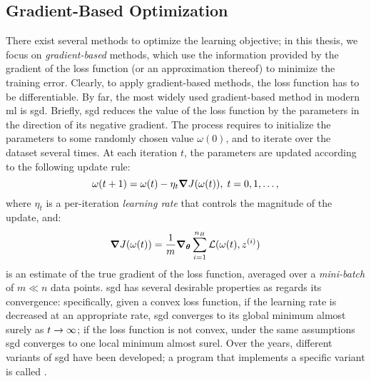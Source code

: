 \subsection{Gradient-Based Optimization}
There exist several methods to optimize the learning objective; in this thesis, we focus on \emph{gradient-based} methods, which use the information provided by the gradient of the loss function (or an approximation thereof) to minimize the training error. Clearly, to apply gradient-based methods, the loss function has to be differentiable. By far, the most widely used gradient-based method in modern \gls{ml} is \gls{sgd}. Briefly, \gls{sgd} reduces the value of the loss function by  the parameters in the direction of its negative gradient. The process requires to initialize the parameters to some randomly chosen value $\omega(0)$, and to iterate over the dataset several times. At each iteration $t$, the parameters are updated according to the following update rule:
$$ \omega(t+1) = \omega(t) - \eta_t \grad J(\omega(t)),\; t= 0, 1, \ldots,$$
where $\eta_t$ is a per-iteration \emph{learning rate} that controls the magnitude of the update, and:
$$ \grad J(\omega(t)) = \frac{1}{m} \grad_{\Param}  \sum_{i=1}^{n_B} \Loss(\omega(t), z^{(i)})$$
is an estimate of the true gradient of the loss function, averaged over a \emph{mini-batch} of $m \ll n$ data points. \gls{sgd} has several desirable properties as regards its convergence: specifically, given a convex loss function, if the learning rate is decreased at an appropriate rate, \gls{sgd} converges to its global minimum almost surely as $t \shortrightarrow \infty$; if the loss function is not convex, under the same assumptions \gls{sgd} converges to one local minimum almost surel. Over the years, different variants of \gls{sgd} have been developed; a program that implements a specific variant is called .

